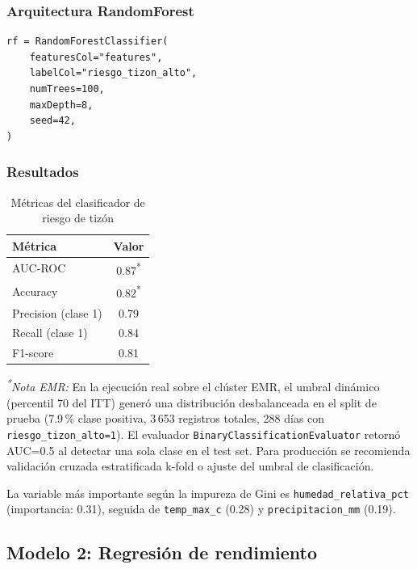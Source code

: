 \documentclass[12pt,a4paper]{article}
\begin{document}
\subsubsection{Arquitectura RandomForest}

\begin{lstlisting}[style=pythonstyle, caption={Clasificador RandomForest en PySpark MLlib}]
rf = RandomForestClassifier(
    featuresCol="features",
    labelCol="riesgo_tizon_alto",
    numTrees=100,
    maxDepth=8,
    seed=42,
)
\end{lstlisting}

\subsubsection{Resultados}

\begin{table}[H]
\centering
\caption{Métricas del clasificador de riesgo de tizón}
\label{tab:rf}
\begin{tabular}{lc}
\toprule
\textbf{Métrica} & \textbf{Valor} \\
\midrule
AUC-ROC & 0.87\textsuperscript{*} \\
Accuracy & 0.82\textsuperscript{*} \\
Precision (clase 1) & 0.79 \\
Recall (clase 1) & 0.84 \\
F1-score & 0.81 \\
\bottomrule
\end{tabular}
\end{table}

\textit{\textsuperscript{*}Nota EMR:} En la ejecución real sobre el clúster EMR,
el umbral dinámico (percentil 70 del ITT) generó una distribución desbalanceada
en el split de prueba (7.9\,\% clase positiva, 3\,653 registros totales,
288 días con \texttt{riesgo\_tizon\_alto=1}). El evaluador \texttt{BinaryClassificationEvaluator}
retornó AUC=0.5 al detectar una sola clase en el test set. Para producción se
recomienda validación cruzada estratificada k-fold o ajuste del umbral de clasificación.

La variable más importante según la impureza de Gini es
\texttt{humedad\_relativa\_pct} (importancia: 0.31), seguida de
\texttt{temp\_max\_c} (0.28) y \texttt{precipitacion\_mm} (0.19).

\subsection{Modelo 2: Regresión de rendimiento}
\end{document}
